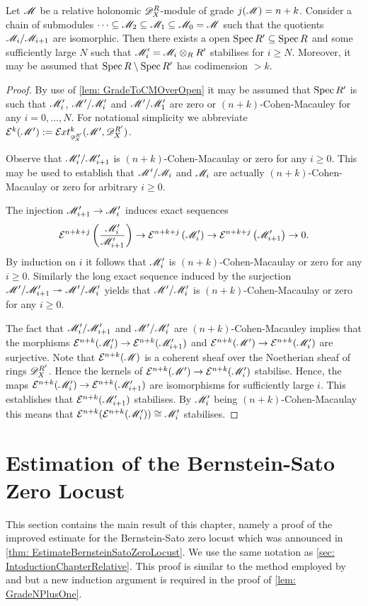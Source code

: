 \begin{lemma}\label{lem: StabilisationChains}
  Let $\mathscr{M}$ be a relative holonomic $\mathscr{D}_X^R$-module of grade $j(\mathscr{M}) = n+k$.
  Consider a chain of submodules $\cdots \subseteq \mathscr{M}_2\subseteq\mathscr{M}_1 \subseteq \mathscr{M}_0 = \mathscr{M} $
  such that the quotients $\mathscr{M}_i/\mathscr{M}_{i+1}$ are isomorphic.
  Then there exists a open $\operatorname{Spec} R' \subseteq \operatorname{Spec} R$ and some sufficiently large $N$ such that $\mathscr{M}_i' = \mathscr{M}_i\otimes_R R'$ stabilises for $i\geq N$. Moreover, it may be assumed that $\operatorname{Spec} R \setminus \operatorname{Spec} R'$ has codimension $>k$.
\end{lemma}
\begin{proof}
  By use of \cref{lem: GradeToCMOverOpen} it may be assumed that $\operatorname{Spec} R'$ is such that $\mathscr{M}_i'$, $\mathscr{M}'/\mathscr{M}_i'$ and $\mathscr{M}'/\mathscr{M}_1'$ are zero or $(n+k)$-Cohen-Macauley for any $i=0,\ldots,N$.
  For notational simplicity we abbreviate $\E^{k}(\M') :=\Ex{\D_X^{R'}}{k}(\M',\D_X^{R'})$.

  Observe that $ \mathscr{M}_i'/\mathscr{M}_{i+1}'$ is $(n+k)$-Cohen-Macaulay or zero for any $i\geq 0$.
  This may be used to establish that $\mathscr{M}'/\mathscr{M}_i$ and $\mathscr{M}_i$ are actually $(n+k)$-Cohen-Macaulay or zero for arbitrary $i\geq 0$.

  The injection $ \mathscr{M}_{i+1}'\to \mathscr{M}_i'$ induces exact sequences
  $$\mathcal{E}^{n+k+j}\left(\frac{\mathscr{M}_i'}{ \mathscr{M}_{i+1}'}\right) \to  \mathcal{E}^{n+k+j}\left(\mathscr{M}_i'\right) \to \mathcal{E}^{n+k +j}\left( \mathscr{M}_{i+1}'\right)\to 0.$$
  By induction on $i$ it follows that $\mathscr{M}_i'$ is $(n+k)$-Cohen-Macaulay or zero for any $i\geq 0$.
  Similarly the long exact sequence induced by the surjection $\mathscr{M}'/\mathscr{M}_{i+1}' \twoheadrightarrow \mathscr{M}'/\mathscr{M}_i'$ yields that $\mathscr{M}'/\mathscr{M}_i'$ is $(n+k)$-Cohen-Macaulay or zero for any $i\geq 0$.


  The fact that $\mathscr{M}_i'/\mathscr{M}_{i+1}'$ and $\mathscr{M}'/\mathscr{M}_{i}'$ are $(n+k)$-Cohen-Macauley implies that the morphisms $\mathcal{E}^{n+k}(\mathscr{M}_i') \to  \mathcal{E}^{n+k}(\mathscr{M}_{i+1}')$ and $\mathcal{E}^{n+k}(\mathscr{M}') \to \mathcal{E}^{n+k} (\mathscr{M}_i')$ are surjective.
  Note that $\mathcal{E}^{n+k}(\mathscr{M})$ is a coherent sheaf over the Noetherian sheaf of rings $\mathscr{D}_X^{R'}$.
  Hence the kernels of $\mathcal{E}^{n+k}(\mathscr{M}') \to \mathcal{E}^{n+k} (\mathscr{M}_i')$ stabilise.
  Hence, the maps $\mathcal{E}^{n+k}(\mathscr{M}_i') \to  \mathcal{E}^{n+k}(\mathscr{M}_{i+1}')$ are isomorphisms for sufficiently large $i$.
  This establishes that $\mathcal{E}^{n+k}(\mathscr{M}_{i+1}')$ stabilises.
  By $ \mathscr{M}_i'$ being $(n+k)$-Cohen-Macaulay this means that $\mathcal{E}^{n+k}(\mathcal{E}^{n+k}(\mathscr{M}_i')) \cong \mathscr{M}_i'$ stabilises.
\end{proof}
\section{Estimation of the Bernstein-Sato Zero Locust}\label{sec: EstimationBSZeroLocust}
This section contains the main result of this chapter, namely a proof of the improved estimate for the Bernstein-Sato zero locust which was announced in \cref{thm: EstimateBernsteinSatoZeroLocust}.
We use the same notation as \cref{sec: IntoductionChapterRelative}.
This proof is similar to the method employed by \cite{lichtin1989poles} and \cite{kashiwara1976b} but a new induction argument is required in the proof of \cref{lem: GradeNPlusOne}.\\

